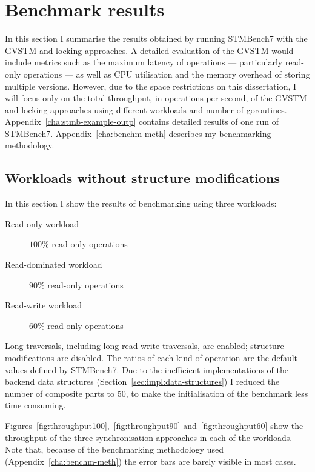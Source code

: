 \documentclass[12pt,a4paper,oneside,openright]{report}
\begin{document}
\section{Benchmark results}
\label{sec:eval:benchmark-results}

In this section I summarise the results obtained by running STMBench7
with the GVSTM and locking approaches. A detailed evaluation of the
GVSTM would include metrics such as the maximum latency of operations
--- particularly read-only operations --- as well as CPU utilisation
and the memory overhead of storing multiple versions. However, due to
the space restrictions on this dissertation, I will focus only on the
total throughput, in operations per second, of the GVSTM and locking
approaches using different workloads and number of goroutines.
Appendix~\ref{cha:stmb-example-outp} contains detailed results of one
run of STMBench7. Appendix~\ref{cha:benchm-meth} describes my
benchmarking methodology.

\subsection{Workloads without structure modifications}
\label{sec:impl:workloads}

In this section I show the results of benchmarking using three
workloads:

\begin{description}
\item[Read only workload] $100\%$ read-only operations
\item[Read-dominated workload] $90\%$ read-only operations
\item[Read-write workload] $60\%$ read-only operations
\end{description}
Long traversals, including long read-write traversals, are enabled;
structure modifications are disabled. The ratios of each kind of
operation are the default values defined by STMBench7. Due to the
inefficient implementations of the backend data structures
(Section~\ref{sec:impl:data-structures}) I reduced the number of
composite parts to 50, to make the initialisation of the benchmark
less time consuming.

Figures~\ref{fig:throughput100},~\ref{fig:throughput90}
and~\ref{fig:throughput60} show the throughput of the three
synchronisation approaches in each of the workloads. Note that,
because of the benchmarking methodology used
(Appendix~\ref{cha:benchm-meth}) the error bars are barely visible in
most cases.
\end{document}
